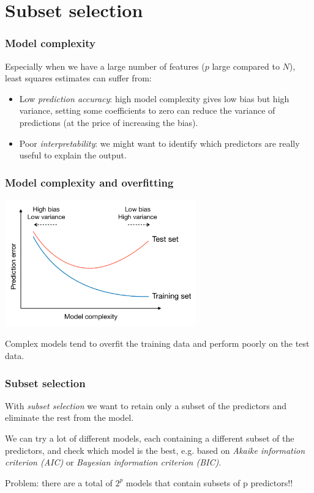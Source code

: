 \documentclass[notes]{beamer}          %
\begin{document}
\section{Subset selection}

\begin{frame}
\frametitle{Model complexity}

Especially when we have a large number of features ($p$ large compared to $N$), least squares estimates can suffer from:

\begin{itemize}
    \item Low \textit{prediction accuracy}: high model complexity gives low bias but high variance, setting some coefficients to zero can reduce the variance of predictions (at the price of increasing the bias).
    \item Poor \textit{interpretability}: we might want to identify which predictors are really useful to explain the output.
\end{itemize}

\end{frame}

\begin{frame}
\frametitle{Model complexity and overfitting}

\begin{center}
\includegraphics[height=5.5cm]{../figures/week_2_linear_models/Bias_variance_complexity.pdf}
\end{center}

Complex models tend to overfit the training data and perform poorly on the test data.

\end{frame}



\begin{frame}
\frametitle{Subset selection}

With \textit{subset selection} we want to retain only a subset of the predictors and eliminate the rest from the model.

\vspace{5mm} 

We can try a lot of different models, each containing a different subset of the predictors, and check which model is the best, e.g. based on \textit{Akaike information criterion (AIC)} or \textit{Bayesian information criterion (BIC)}.

\vspace{5mm} 

Problem: there are a total of $2^p$ models that contain subsets of p predictors!!

\end{frame}
\end{document}
